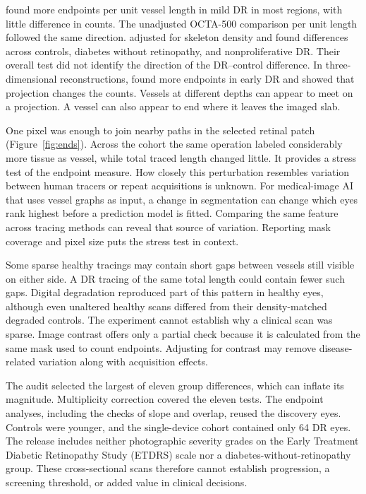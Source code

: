 \documentclass[letterpaper]{article}
\begin{document}
\citet{yu2024branching} found more endpoints per unit vessel length in mild DR in most regions, with little difference in counts. The unadjusted OCTA-500 comparison per unit length followed the same direction. \citet{zare2026remodeling} adjusted for skeleton density and found differences across controls, diabetes without retinopathy, and nonproliferative DR. Their overall test did not identify the direction of the DR--control difference. In three-dimensional reconstructions, \citet{zhang2026radar} found more endpoints in early DR and showed that projection changes the counts. Vessels at different depths can appear to meet on a projection. A vessel can also appear to end where it leaves the imaged slab.

One pixel was enough to join nearby paths in the selected retinal patch (Figure~\ref{fig:ends}). Across the cohort the same operation labeled considerably more tissue as vessel, while total traced length changed little. It provides a stress test of the endpoint measure. How closely this perturbation resembles variation between human tracers or repeat acquisitions is unknown. For medical-image AI that uses vessel graphs as input, a change in segmentation can change which eyes rank highest before a prediction model is fitted. Comparing the same feature across tracing methods can reveal that source of variation. Reporting mask coverage and pixel size puts the stress test in context.

Some sparse healthy tracings may contain short gaps between vessels still visible on either side. A DR tracing of the same total length could contain fewer such gaps. Digital degradation reproduced part of this pattern in healthy eyes, although even unaltered healthy scans differed from their density-matched degraded controls. The experiment cannot establish why a clinical scan was sparse. Image contrast offers only a partial check because it is calculated from the same mask used to count endpoints. Adjusting for contrast may remove disease-related variation along with acquisition effects.

The audit selected the largest of eleven group differences, which can inflate its magnitude. Multiplicity correction covered the eleven tests. The endpoint analyses, including the checks of slope and overlap, reused the discovery eyes. Controls were younger, and the single-device cohort contained only 64 DR eyes. The release includes neither photographic severity grades on the Early Treatment Diabetic Retinopathy Study (ETDRS) scale nor a diabetes-without-retinopathy group. These cross-sectional scans therefore cannot establish progression, a screening threshold, or added value in clinical decisions.
\end{document}
